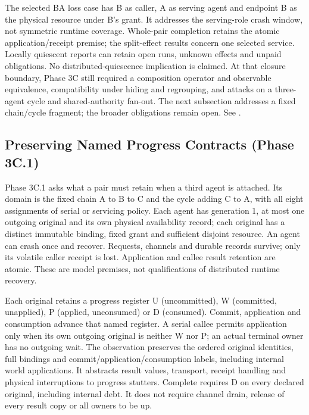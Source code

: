 \documentclass[11pt,a4paper]{article}
\theoremstyle{definition}
\theoremstyle{remark}
\begin{document}
The selected BA loss case has B as caller, A as serving agent and endpoint B as the physical resource under B's grant. It addresses the serving-role crash window, not symmetric runtime coverage. Whole-pair completion retains the atomic application/receipt premise; the split-effect results concern one selected service. Locally quiescent reports can retain open runs, unknown effects and unpaid obligations. No distributed-quiescence implication is claimed. At that closure boundary, Phase 3C still required a composition operator and observable equivalence, compatibility under hiding and regrouping, and attacks on a three-agent cycle and shared-authority fan-out. The next subsection addresses a fixed chain/cycle fragment; the broader obligations remain open. See .

\subsection{Preserving Named Progress Contracts (Phase 3C.1)}

Phase 3C.1 asks what a pair must retain when a third agent is attached. Its domain is the fixed chain A to B to C and the cycle adding C to A, with all eight assignments of serial or servicing policy. Each agent has generation 1, at most one outgoing original and its own physical availability record; each original has a distinct immutable binding, fixed grant and sufficient disjoint resource. An agent can crash once and recover. Requests, channels and durable records survive; only its volatile caller receipt is lost. Application and callee result retention are atomic. These are model premises, not qualifications of distributed runtime recovery.

Each original retains a progress register U (uncommitted), W (committed, unapplied), P (applied, unconsumed) or D (consumed). Commit, application and consumption advance that named register. A serial callee permits application only when its own outgoing original is neither W nor P; an actual terminal owner has no outgoing wait. The observation preserves the ordered original identities, full bindings and commit/application/consumption labels, including internal world applications. It abstracts result values, transport, receipt handling and physical interruptions to progress stutters. Complete requires D on every declared original, including internal debt. It does not require channel drain, release of every result copy or all owners to be up.
\end{document}
